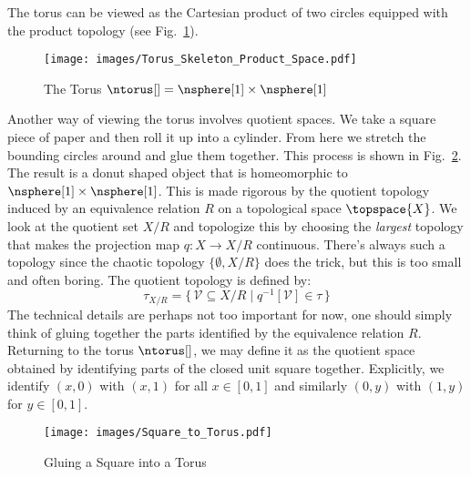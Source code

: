         \begin{example}
            The torus can be viewed as the Cartesian product of two
            circles equipped with the product topology
            (see Fig.~\ref{fig:Torus_as_Prod_Space}).
        \end{example}
        \begin{figure}[H]
            \centering
            \captionsetup{type=figure}
            \texttt{[image: images/Torus\_Skeleton\_Product\_Space.pdf]}
            \caption{The Torus $\ntorus[]=\nsphere[1]\times\nsphere[1]$}
            \label{fig:Torus_as_Prod_Space}
        \end{figure}
        Another way of viewing the torus involves quotient spaces. We
        take a square piece of paper and then roll it up into a
        cylinder. From here we stretch the bounding circles around and
        glue them together. This process is shown in
        Fig.~\ref{fig:Square_to_Torus}. The result is a donut shaped
        object that is homeomorphic to $\nsphere[1]\times\nsphere[1]$.
        This is made rigorous by the quotient topology induced by an
        equivalence relation $R$ on a topological space
        $\topspace{X}$. We look at the quotient
        set $X/R$ and topologize this by choosing the \textit{largest}
        topology that makes the projection map $q:X\rightarrow{X}/R$
        continuous. There's always such a topology since the chaotic
        topology $\{\emptyset,X/R\}$ does the trick, but this is too
        small and often boring. The quotient topology is defined by:%
        \begin{equation}
            \tau_{X/R}=\{\,\mathcal{V}\subseteq{X}/R\;|\;
                q^{\minus{1}}[\mathcal{V}]\in\tau\,\}
        \end{equation}
        The technical details are perhaps not too important for now, one
        should simply think of gluing together the parts identified by
        the equivalence relation $R$. Returning to the torus
        $\ntorus[]$, we may define it as the quotient space obtained by
        identifying parts of the closed unit square together.
        Explicitly, we identify $(x,0)$ with $(x,1)$ for all $x\in[0,1]$
        and similarly $(0,y)$ with $(1,y)$ for $y\in[0,1]$.
        \begin{figure}[H]
            \centering
            \captionsetup{type=figure}
            \texttt{[image: images/Square\_to\_Torus.pdf]}
            \caption{Gluing a Square into a Torus}
            \label{fig:Square_to_Torus}
        \end{figure}
